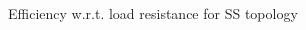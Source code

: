\begin{figure}[h]
\centering
\begin{subfigmatrix}{2} 
\end{subfigmatrix}
\end{figure}
\begin{figure}[H]
\centering
\begin{subfigmatrix}{1} 
\end{subfigmatrix}
\caption{Efficiency w.r.t. load resistance for SS topology}
\end{figure}

